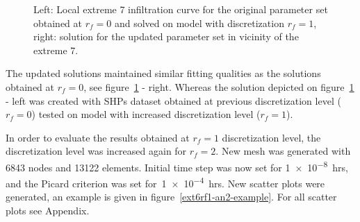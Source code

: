 \documentclass[review]{elsarticle}
\begin{document}
\begin{figure}
\caption{Left: Local extreme 7 infiltration curve for the original parameter set obtained at $r_f=0$ and solved on model with discretization $r_f=1$, right: solution for the updated parameter set in  vicinity of the extreme 7.}
\label{rf1examples}
\end{figure}

The updated solutions maintained similar fitting qualities as the solutions obtained at $r_f=0$, see figure~\ref{rf1examples} - right. Whereas the solution depicted on figure~\ref{rf1examples} - left was created with SHPs dataset obtained at previous discretization level ($r_f=0$) tested on model with increased discretization level ($r_f=1$).

In order to evaluate the results obtained at $r_f=1$ discretization level, the discretization level was increased again for $r_f=2$. New mesh was generated with 6843 nodes and 13122 elements. Initial time step was now set for \num{1e-8}~hrs, and the Picard criterion was set for~\num{1e-4}~hrs. New scatter plots were generated, an example is given in figure~\ref{ext6rf1-an2-example}. For all scatter plots see Appendix.
\end{document}
